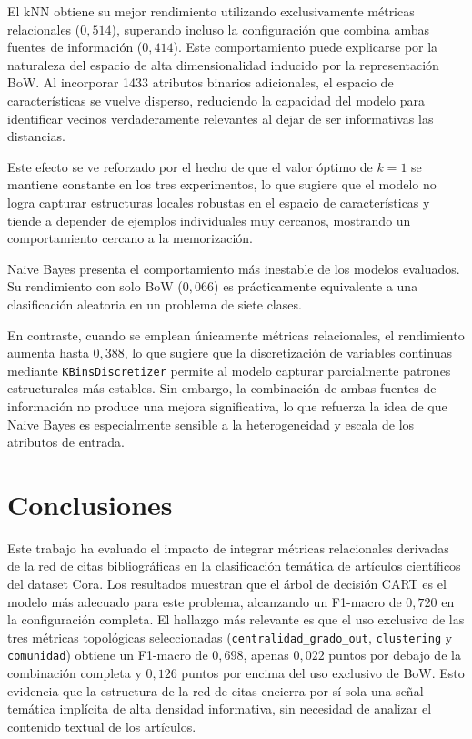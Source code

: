 \documentclass[conference,a4paper]{IEEEtran}
\begin{document}
El kNN obtiene su mejor rendimiento utilizando exclusivamente métricas relacionales ($0{,}514$), superando incluso la configuración 
que combina ambas fuentes de información ($0{,}414$). Este comportamiento puede explicarse por la naturaleza del espacio de alta 
dimensionalidad inducido por la representación BoW. Al incorporar 1433 atributos binarios adicionales, el espacio de características se 
vuelve disperso, reduciendo la capacidad del modelo para identificar vecinos verdaderamente relevantes al dejar de ser informativas las distancias.

Este efecto se ve reforzado por el hecho de que el valor óptimo de $k=1$ se mantiene constante en los tres experimentos, 
lo que sugiere que el modelo no logra capturar estructuras locales robustas en el espacio de características y tiende a depender de 
ejemplos individuales muy cercanos, mostrando un comportamiento cercano a la memorización.

Naive Bayes presenta el comportamiento más inestable de los modelos evaluados. Su rendimiento con solo BoW ($0{,}066$) 
es prácticamente equivalente a una clasificación aleatoria en un problema de siete clases.

En contraste, cuando se emplean únicamente métricas relacionales, el rendimiento aumenta hasta $0{,}388$, lo que sugiere que 
la discretización de variables continuas mediante \texttt{KBinsDiscretizer} permite al modelo capturar parcialmente patrones estructurales más estables. 
Sin embargo, la combinación de ambas fuentes de información no produce una mejora significativa, lo que refuerza la idea de que Naive Bayes es especialmente 
sensible a la heterogeneidad y escala de los atributos de entrada.


\section{Conclusiones}
\label{sec:conclusiones}

Este trabajo ha evaluado el impacto de integrar métricas relacionales 
derivadas de la red de citas bibliográficas en la clasificación 
temática de artículos científicos del dataset Cora. Los resultados 
muestran que el árbol de decisión CART es el modelo más adecuado 
para este problema, alcanzando un F1-macro de $0{,}720$ en la 
configuración completa. El hallazgo más relevante es que el uso 
exclusivo de las tres métricas topológicas seleccionadas 
(\texttt{centralidad\_grado\_out}, \texttt{clustering} y 
\texttt{comunidad}) obtiene un F1-macro de $0{,}698$, apenas 
$0{,}022$ puntos por debajo de la combinación completa y $0{,}126$ 
puntos por encima del uso exclusivo de BoW. Esto evidencia que la 
estructura de la red de citas encierra por sí sola una señal 
temática implícita de alta densidad informativa, sin necesidad de 
analizar el contenido textual de los artículos.
\end{document}
